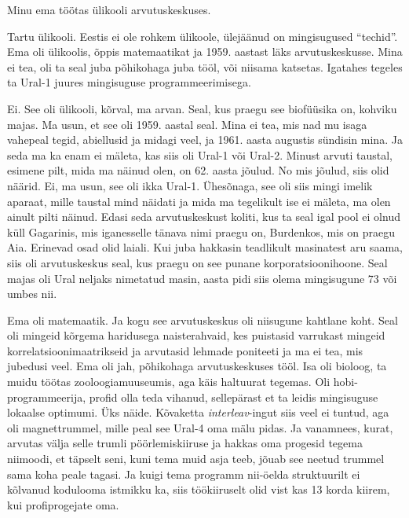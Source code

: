 

Minu ema töötas ülikooli arvutuskeskuses.


Tartu ülikooli. Eestis ei ole rohkem ülikoole,  ülejäänud on mingisugused \enquote{techid}. Ema oli ülikoolis, õppis matemaatikat ja 1959. aastast läks arvutuskeskusse. Mina ei tea,  oli ta seal juba põhikohaga juba tööl, või niisama katsetas. Igatahes tegeles ta Ural-1  juures mingisuguse programmeerimisega. 

Ei. See oli ülikooli, kõrval, ma arvan. Seal, kus praegu see biofüüsika on, kohviku majas.  Ma usun, et see oli 1959. aastal seal. Mina ei tea, mis nad mu isaga  vahepeal tegid,  abiellusid ja midagi veel, ja 1961. aasta augustis sündisin mina. Ja seda ma ka enam ei mäleta, kas siis oli Ural-1 või Ural-2. Minust arvuti taustal, esimene pilt, mida ma näinud olen, on 62. aasta jõulud. No mis jõulud, siis olid näärid. Ei, ma usun, see oli ikka Ural-1. Ühesõnaga, see oli siis mingi imelik aparaat, mille taustal mind näidati ja mida ma tegelikult ise ei mäleta, ma olen ainult pilti näinud. Edasi  seda arvutuskeskust koliti, kus ta seal igal pool ei olnud küll Gagarinis, mis iganesselle tänava nimi praegu on, Burdenkos, mis on praegu Aia. Erinevad osad olid laiali. Kui juba hakkasin teadlikult masinatest aru saama, siis oli arvutuskeskus seal, kus praegu on see punane korporatsioonihoone. Seal majas oli Ural neljaks nimetatud masin, aasta pidi siis olema mingisugune 73 või umbes nii. 


Ema oli matemaatik. Ja kogu see arvutuskeskus oli niisugune kahtlane koht. Seal oli mingeid kõrgema haridusega naisterahvaid, kes puistasid varrukast mingeid korrelatsioonimaatrikseid ja arvutasid  lehmade poniteeti ja ma ei tea, mis jubedusi veel. Ema oli jah, põhikohaga arvutuskeskuses tööl. Isa oli bioloog, ta muidu töötas zooloogiamuuseumis, aga  käis haltuurat tegemas. Oli hobi-programmeerija, profid olla teda vihanud, sellepärast et ta leidis mingisuguse lokaalse optimumi. Üks näide. Kõvaketta \emph{interleav}-ingut siis veel ei tuntud, aga oli magnettrummel, mille peal see Ural-4 oma mälu pidas. Ja vanamnees, kurat, arvutas välja selle trumli pöörlemiskiiruse ja hakkas oma progesid tegema niimoodi, et täpselt seni, kuni tema muid asja teeb, jõuab see neetud trummel sama koha peale tagasi. Ja kuigi tema programm nii-öelda struktuurilt ei kõlvanud kodulooma istmikku ka, siis töökiiruselt olid vist kas 13 korda kiirem, kui profiprogejate oma.

